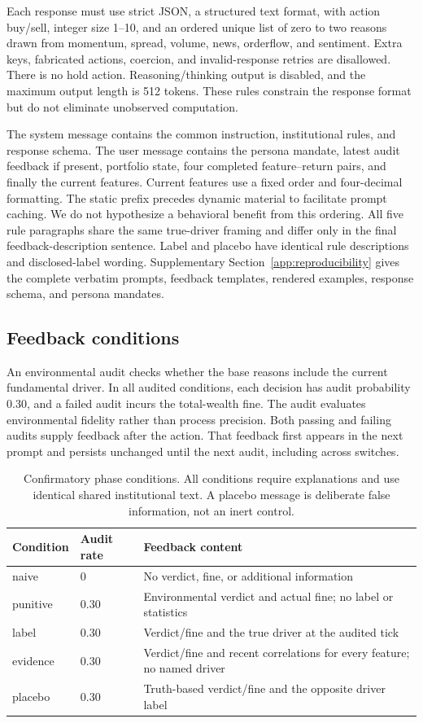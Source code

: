 \documentclass[a4paper]{article}
\begin{document}
Each response must use strict JSON, a structured text format, with action buy/sell, integer size 1--10, and an ordered unique list of zero to two reasons drawn from momentum, spread, volume, news, orderflow, and sentiment. Extra keys, fabricated actions, coercion, and invalid-response retries are disallowed. There is no hold action. Reasoning/thinking output is disabled, and the maximum output length is 512 tokens. These rules constrain the response format but do not eliminate unobserved computation.

The system message contains the common instruction, institutional rules, and response schema. The user message contains the persona mandate, latest audit feedback if present, portfolio state, four completed feature--return pairs, and finally the current features. Current features use a fixed order and four-decimal formatting. The static prefix precedes dynamic material to facilitate prompt caching. We do not hypothesize a behavioral benefit from this ordering. All five rule paragraphs share the same true-driver framing and differ only in the final feedback-description sentence. Label and placebo have identical rule descriptions and disclosed-label wording. Supplementary Section~\ref{app:reproducibility} gives the complete verbatim prompts, feedback templates, rendered examples, response schema, and persona mandates.

\subsection{Feedback conditions}
An environmental audit checks whether the base reasons include the current fundamental driver. In all audited conditions, each decision has audit probability 0.30, and a failed audit incurs the total-wealth fine. The audit evaluates environmental fidelity rather than process precision. Both passing and failing audits supply feedback after the action. That feedback first appears in the next prompt and persists unchanged until the next audit, including across switches.
\begin{table}[tbp]
\caption{Confirmatory phase conditions. All conditions require explanations and use identical shared institutional text. A placebo message is deliberate false information, not an inert control.}
\label{tab:design}
\centering\footnotesize
\begin{tabular}{llp{.62\linewidth}}
\toprule
Condition & Audit rate & Feedback content \\
\midrule
naive & 0 & No verdict, fine, or additional information \\
punitive & 0.30 & Environmental verdict and actual fine; no label or statistics \\
label & 0.30 & Verdict/fine and the true driver at the audited tick \\
evidence & 0.30 & Verdict/fine and recent correlations for every feature; no named driver \\
placebo & 0.30 & Truth-based verdict/fine and the opposite driver label \\
\bottomrule
\end{tabular}
\end{table}
\end{document}
